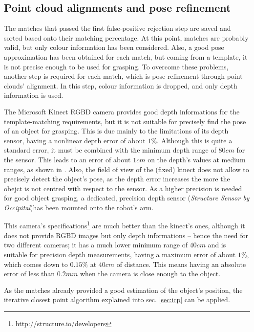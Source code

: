 \subsection{Point cloud alignments and pose refinement}
The matches that passed the first false-positive rejection step are saved and
sorted based onto their matching percentage. At this point, matches are probably
valid, but only colour information has been considered. Also, a good pose
approximation has been obtained for each match, but coming from a template, it
is not precise enough to be used for grasping. To overcome these problems,
another step is required for each match, which is pose refinement through point
clouds' alignment. In this step, colour information is dropped, and only depth
information is used. 

The Microsoft Kinect RGBD camera provides good depth informations for the template-matching
requirements, but it is not suitable for precisely find the pose of an object
for grasping. This is due mainly to the limitations of its depth sensor, having
a nonlinear depth error of about $1\%$.
Although this is quite a standard error, it must be combined with the minimum
depth range of $80\unit{cm}$ for the sensor. This leads to an error of about
$1\unit{cm}$ on the depth's values at medium ranges, as shown in \cite{kinect-evaluation}. Also, the field of view of the (fixed)
kinect does not allow to precisely detect the object's pose, as the depth error
increases the more the obejct is not centred with respect to the sensor. As a
higher precision is needed for good 
object grasping, a dedicated, precision depth sensor (\emph{Structure Sensor by
Occipital})has been mounted onto the robot's arm.


This camera's specifications\footnote{http://structure.io/developers} are much better than the kinect's ones, although it
does not provide RGBD images but only depth informations -- hence the need for two
different cameras; it has a much lower minimum range of $40\unit{cm}$ and is suitable for
precision depth measurements, having a maximum error of about $1\%$, which comes
down to $0.15\%$ at $40\unit{cm}$ of distance. This means having an absolute
error of less than $0.2\unit{mm}$ when the camera is close enough to the object.

As the matches already provided a good estimation of the object's position, the
iterative closest point algorithm explained into sec. \ref{sec:icp} can be
applied. 

